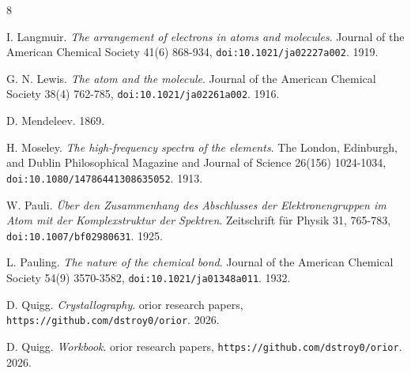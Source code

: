 \backmatter
{}
\begin{thebibliography}{8}

I. Langmuir. \emph{The arrangement of electrons in atoms and molecules}. Journal of the American Chemical Society 41(6) 868-934, \texttt{doi:10.1021/\allowbreak{}ja02227a002}. 1919.

G. N. Lewis. \emph{The atom and the molecule}. Journal of the American Chemical Society 38(4) 762-785, \texttt{doi:10.1021/\allowbreak{}ja02261a002}. 1916.

D. Mendeleev. 1869.

H. Moseley. \emph{The high-frequency spectra of the elements}. The London, Edinburgh, and Dublin Philosophical Magazine and Journal of Science 26(156) 1024-1034, \texttt{doi:10.1080/\allowbreak{}14786441308635052}. 1913.

W. Pauli. \emph{Über den Zusammenhang des Abschlusses der Elektronengruppen im Atom mit der Komplexstruktur der Spektren}. Zeitschrift für Physik 31, 765-783, \texttt{doi:10.1007/\allowbreak{}bf02980631}. 1925.

L. Pauling. \emph{The nature of the chemical bond}. Journal of the American Chemical Society 54(9) 3570-3582, \texttt{doi:10.1021/\allowbreak{}ja01348a011}. 1932.

D. Quigg. \emph{Crystallography}. orior research papers, \texttt{https:/\allowbreak{}/\allowbreak{}github.com/\allowbreak{}dstroy0/\allowbreak{}orior}. 2026.

D. Quigg. \emph{Workbook}. orior research papers, \texttt{https:/\allowbreak{}/\allowbreak{}github.com/\allowbreak{}dstroy0/\allowbreak{}orior}. 2026.

\end{thebibliography}
